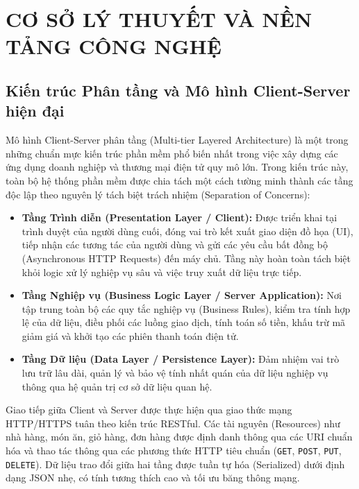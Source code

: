 \documentclass{uetgraduation}
\begin{document}
\chapter{CƠ SỞ LÝ THUYẾT VÀ NỀN TẢNG CÔNG NGHỆ}

\section{Kiến trúc Phân tầng và Mô hình Client-Server hiện đại}
Mô hình Client-Server phân tầng (Multi-tier Layered Architecture) là một trong những chuẩn mực kiến trúc phần mềm phổ biến nhất trong việc xây dựng các ứng dụng doanh nghiệp và thương mại điện tử quy mô lớn. Trong kiến trúc này, toàn bộ hệ thống phần mềm được chia tách một cách tường minh thành các tầng độc lập theo nguyên lý tách biệt trách nhiệm (Separation of Concerns):
\begin{itemize}
    \item \textbf{Tầng Trình diễn (Presentation Layer / Client):} Được triển khai tại trình duyệt của người dùng cuối, đóng vai trò kết xuất giao diện đồ họa (UI), tiếp nhận các tương tác của người dùng và gửi các yêu cầu bất đồng bộ (Asynchronous HTTP Requests) đến máy chủ. Tầng này hoàn toàn tách biệt khỏi logic xử lý nghiệp vụ sâu và việc truy xuất dữ liệu trực tiếp.
    \item \textbf{Tầng Nghiệp vụ (Business Logic Layer / Server Application):} Nơi tập trung toàn bộ các quy tắc nghiệp vụ (Business Rules), kiểm tra tính hợp lệ của dữ liệu, điều phối các luồng giao dịch, tính toán số tiền, khấu trừ mã giảm giá và khởi tạo các phiên thanh toán điện tử.
    \item \textbf{Tầng Dữ liệu (Data Layer / Persistence Layer):} Đảm nhiệm vai trò lưu trữ lâu dài, quản lý và bảo vệ tính nhất quán của dữ liệu nghiệp vụ thông qua hệ quản trị cơ sở dữ liệu quan hệ.
\end{itemize}

Giao tiếp giữa Client và Server được thực hiện qua giao thức mạng HTTP/HTTPS tuân theo kiến trúc RESTful. Các tài nguyên (Resources) như nhà hàng, món ăn, giỏ hàng, đơn hàng được định danh thông qua các URI chuẩn hóa và thao tác thông qua các phương thức HTTP tiêu chuẩn (\texttt{GET}, \texttt{POST}, \texttt{PUT}, \texttt{DELETE}). Dữ liệu trao đổi giữa hai tầng được tuần tự hóa (Serialized) dưới định dạng JSON nhẹ, có tính tương thích cao và tối ưu băng thông mạng.
\end{document}
